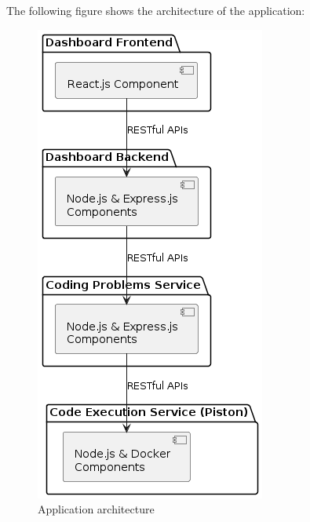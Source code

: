 The following figure shows the architecture of the application:
\begin{figure}[h!]
      \centering
      \includegraphics[height=1\textwidth]{images/softwareArchitecture.png}
      \caption{Application architecture}
      \label{fig:architecture}
\end{figure}